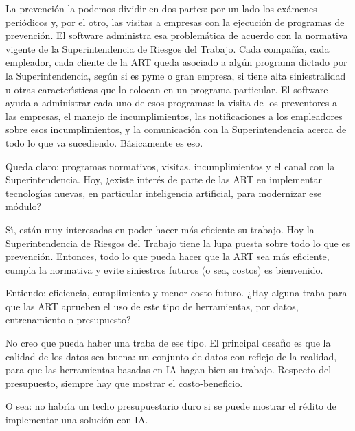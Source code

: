 \begin{description}[style=nextline, leftmargin=0cm, labelsep=0.35cm]
\item[\textbf{Entrevistado:}]
La prevenci\'on la podemos dividir en dos partes: por un lado los ex\'amenes peri\'odicos y, por el otro, las visitas a empresas con la ejecuci\'on de programas de prevenci\'on.
El software administra esa problem\'atica de acuerdo con la normativa vigente de la Superintendencia de Riesgos del Trabajo.
Cada compa\~n\'{\i}a, cada empleador, cada cliente de la ART queda asociado a alg\'un programa dictado por la Superintendencia, seg\'un si es pyme o gran empresa, si tiene alta siniestralidad u otras caracter\'{\i}sticas que lo colocan en un programa particular.
El software ayuda a administrar cada uno de esos programas: la visita de los preventores a las empresas, el manejo de incumplimientos, las notificaciones a los empleadores sobre esos incumplimientos, y la comunicaci\'on con la Superintendencia acerca de todo lo que va sucediendo.
B\'asicamente es eso.

\item[\textbf{Entrevistador:}]
Queda claro: programas normativos, visitas, incumplimientos y el canal con la Superintendencia.
Hoy, ¿existe inter\'es de parte de las ART en implementar tecnolog\'{\i}as nuevas, en particular inteligencia artificial, para modernizar ese m\'odulo?

\item[\textbf{Entrevistado:}]
S\'{\i}, est\'an muy interesadas en poder hacer m\'as eficiente su trabajo.
Hoy la Superintendencia de Riesgos del Trabajo tiene la lupa puesta sobre todo lo que es prevenci\'on.
Entonces, todo lo que pueda hacer que la ART sea m\'as eficiente, cumpla la normativa y evite siniestros futuros (o sea, costos) es bienvenido.

\item[\textbf{Entrevistador:}]
Entiendo: eficiencia, cumplimiento y menor costo futuro.
¿Hay alguna traba para que las ART aprueben el uso de este tipo de herramientas, por datos, entrenamiento o presupuesto?

\item[\textbf{Entrevistado:}]
No creo que pueda haber una traba de ese tipo.
El principal desaf\'{\i}o es que la calidad de los datos sea buena: un conjunto de datos con reflejo de la realidad, para que las herramientas basadas en IA hagan bien su trabajo.
Respecto del presupuesto, siempre hay que mostrar el costo-beneficio.

\item[\textbf{Entrevistador:}]
O sea: no habr\'{\i}a un techo presupuestario duro si se puede mostrar el r\'edito de implementar una soluci\'on con IA.


\end{description}
